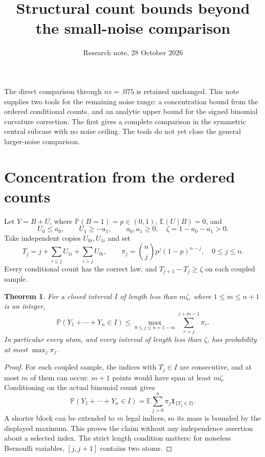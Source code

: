 \documentclass[11pt,a4paper]{article}
\title{Structural count bounds beyond the small-noise comparison}
\author{Research note, 28 October 2026}\date{}
\newcommand{\E}{\mathbb E}\newcommand{\Pp}{\mathbb P}
\newtheorem{theorem}{Theorem}\newtheorem{lemma}[theorem]{Lemma}
\begin{document}
\maketitle

The direct comparison through $ns=.075$ is retained unchanged. This note
supplies two tools for the remaining noise range: a concentration bound
from the ordered conditional counts, and an analytic upper bound for the
signed binomial curvature correction. The first gives a complete comparison
in the symmetric central subcase with no noise ceiling. The tools do not
yet close the general larger-noise comparison.

\section{Concentration from the ordered counts}
Let $Y=B+U$, where $\Pp(B=1)=p\in(0,1)$, $\E(U\mid B)=0$, and
\[
 U_0\le a_0,\qquad U_1\ge-a_1,\qquad
 a_0,a_1\ge0,\quad \zeta=1-a_0-a_1>0.
\]
Take independent copies $U_{0i},U_{1i}$ and set
\[
 T_j=j+\sum_{i\le j}U_{1i}+\sum_{i>j}U_{0i},\qquad
 \pi_j=\binom njp^j(1-p)^{n-j},\quad0\le j\le n.
\]
Every conditional count has the correct law, and
$T_{j+1}-T_j\ge\zeta$ on each coupled sample.

\begin{theorem}\label{thm:concentration}
For a closed interval $I$ of length less than $m\zeta$, where
$1\le m\le n+1$ is an integer,
\[
 \Pp(Y_1+\cdots+Y_n\in I)
       \le\max_{0\le j\le n+1-m}\sum_{r=j}^{j+m-1}\pi_r.
\]
In particular every atom, and every interval of length less than $\zeta$,
has probability at most $\max_j\pi_j$.
\end{theorem}
\begin{proof}
For each coupled sample, the indices with $T_j\in I$ are consecutive,
and at most $m$ of them can occur: $m+1$ points would have span at least
$m\zeta$. Conditioning on the actual binomial count gives
\[
 \Pp(Y_1+\cdots+Y_n\in I)
       =\E\sum_{j=0}^n\pi_j\mathbf1_{\{T_j\in I\}}.
\]
A shorter block can be extended to $m$ legal indices, so its mass is
bounded by the displayed maximum. This proves the claim without any
independence assertion about a selected index. The strict length condition
matters: for noiseless Bernoulli variables, $[j,j+1]$ contains two atoms.
\end{proof}
\end{document}
